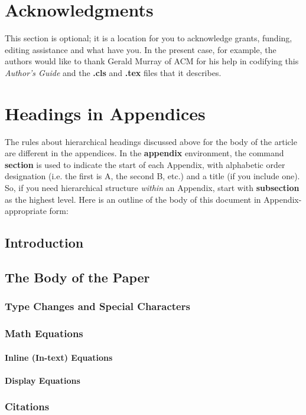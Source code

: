 \documentclass{aamas2016}
\begin{document}
\section*{Acknowledgments}
{\color{red} 
This section is optional; it is a location for you
to acknowledge grants, funding, editing assistance and
what have you.  In the present case, for example, the
authors would like to thank Gerald Murray of ACM for
his help in codifying this \textit{Author's Guide}
and the \textbf{.cls} and \textbf{.tex} files that it describes.
}
%
\appendix
\section{Headings in Appendices}
{\color{red} 
The rules about hierarchical headings discussed above for
the body of the article are different in the appendices.
In the \textbf{appendix} environment, the command
\textbf{section} is used to
indicate the start of each Appendix, with alphabetic order
designation (i.e. the first is A, the second B, etc.) and
a title (if you include one).  So, if you need
hierarchical structure
\textit{within} an Appendix, start with \textbf{subsection} as the
highest level. Here is an outline of the body of this
document in Appendix-appropriate form:
\subsection{Introduction}
\subsection{The Body of the Paper}
\subsubsection{Type Changes and  Special Characters}
\subsubsection{Math Equations}
\paragraph{Inline (In-text) Equations}
\paragraph{Display Equations}
\subsubsection{Citations}
}
\end{document}
